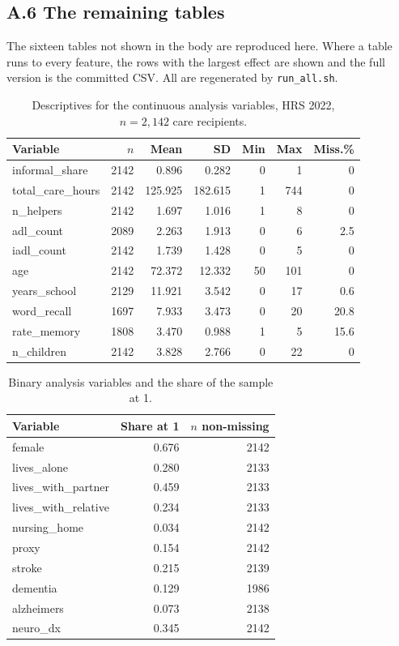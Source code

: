 \documentclass[9pt,twoside]{pnas-new}
\begin{document}
\FloatBarrier
\subsection*{A.6 The remaining tables}\leavevmode\par\nobreak
{}

The sixteen tables not shown in the body are reproduced here. Where a table runs to every feature, the rows with the largest effect are shown and the full version is the committed CSV. All are regenerated by \texttt{run\_all.sh}.

\begin{table}[!ht]
\centering
\caption{Descriptives for the continuous analysis variables, HRS 2022, $n=2{,}142$ care recipients.}
\label{tab:b-desc}
\footnotesize
\begin{tabular}{lrrrrrr}
\toprule
Variable & $n$ & Mean & SD & Min & Max & Miss.\% \\
\midrule
informal\_share & 2142 & 0.896 & 0.282 & 0 & 1 & 0 \\
total\_care\_hours & 2142 & 125.925 & 182.615 & 1 & 744 & 0 \\
n\_helpers & 2142 & 1.697 & 1.016 & 1 & 8 & 0 \\
adl\_count & 2089 & 2.263 & 1.913 & 0 & 6 & 2.5 \\
iadl\_count & 2142 & 1.739 & 1.428 & 0 & 5 & 0 \\
age & 2142 & 72.372 & 12.332 & 50 & 101 & 0 \\
years\_school & 2129 & 11.921 & 3.542 & 0 & 17 & 0.6 \\
word\_recall & 1697 & 7.933 & 3.473 & 0 & 20 & 20.8 \\
rate\_memory & 1808 & 3.470 & 0.988 & 1 & 5 & 15.6 \\
n\_children & 2142 & 3.828 & 2.766 & 0 & 22 & 0 \\
\bottomrule
\end{tabular}
\end{table}

\begin{table}[!ht]
\centering
\caption{Binary analysis variables and the share of the sample at 1.}
\label{tab:b-binary}
\small
\begin{tabular}{lrr}
\toprule
Variable & Share at 1 & $n$ non-missing \\
\midrule
female & 0.676 & 2142 \\
lives\_alone & 0.280 & 2133 \\
lives\_with\_partner & 0.459 & 2133 \\
lives\_with\_relative & 0.234 & 2133 \\
nursing\_home & 0.034 & 2142 \\
proxy & 0.154 & 2142 \\
stroke & 0.215 & 2139 \\
dementia & 0.129 & 1986 \\
alzheimers & 0.073 & 2138 \\
neuro\_dx & 0.345 & 2142 \\
\bottomrule
\end{tabular}
\end{table}
\end{document}
